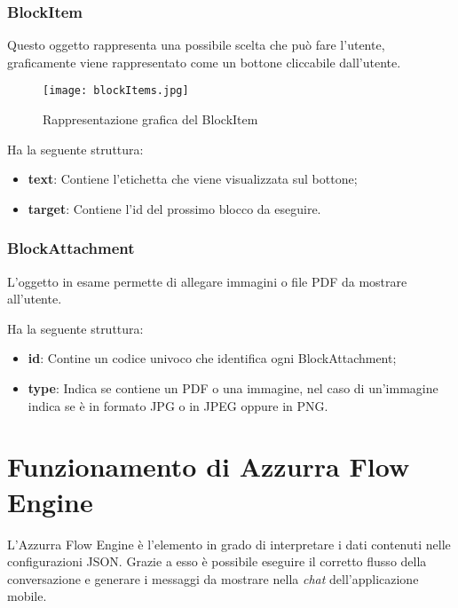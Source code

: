 \subsubsection*{BlockItem}
Questo oggetto rappresenta una possibile scelta che può fare l'utente, graficamente viene rappresentato come un bottone cliccabile dall'utente.

\begin{figure}[h]
	\centering
	\texttt{[image: blockItems.jpg]}
	\caption{Rappresentazione grafica del BlockItem}
\end{figure}
Ha la seguente struttura:

\begin{itemize}
	\item \textbf{text}: Contiene l'etichetta che viene visualizzata sul bottone;
	\item \textbf{target}: Contiene l'id del prossimo blocco da eseguire.
\end{itemize}



\subsubsection*{BlockAttachment} 
L'oggetto in esame permette di allegare immagini o file PDF da mostrare all'utente.

Ha la seguente struttura:

\begin{itemize}
	\item \textbf{id}: Contine un codice univoco che identifica ogni BlockAttachment;
	\item \textbf{type}: Indica se contiene un PDF o una immagine, nel caso di un'immagine indica se è in formato JPG o in JPEG oppure in PNG.
\end{itemize}	

\section{Funzionamento di Azzurra Flow Engine}
L'Azzurra Flow Engine è l'elemento in grado di interpretare i dati contenuti nelle configurazioni JSON. Grazie a esso è possibile eseguire il corretto flusso della conversazione e generare i messaggi da mostrare nella \emph{chat} dell'applicazione mobile. 

